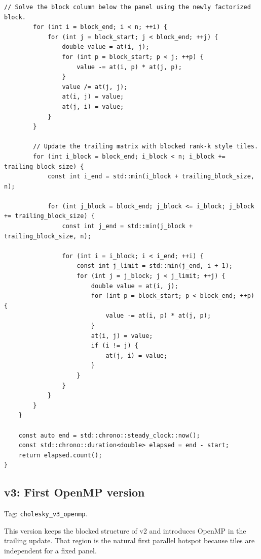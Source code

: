 \begin{lstlisting}[style=appendixcode]
        // Solve the block column below the panel using the newly factorized block.
        for (int i = block_end; i < n; ++i) {
            for (int j = block_start; j < block_end; ++j) {
                double value = at(i, j);
                for (int p = block_start; p < j; ++p) {
                    value -= at(i, p) * at(j, p);
                }
                value /= at(j, j);
                at(i, j) = value;
                at(j, i) = value;
            }
        }

        // Update the trailing matrix with blocked rank-k style tiles.
        for (int i_block = block_end; i_block < n; i_block += trailing_block_size) {
            const int i_end = std::min(i_block + trailing_block_size, n);

            for (int j_block = block_end; j_block <= i_block; j_block += trailing_block_size) {
                const int j_end = std::min(j_block + trailing_block_size, n);

                for (int i = i_block; i < i_end; ++i) {
                    const int j_limit = std::min(j_end, i + 1);
                    for (int j = j_block; j < j_limit; ++j) {
                        double value = at(i, j);
                        for (int p = block_start; p < block_end; ++p) {
                            value -= at(i, p) * at(j, p);
                        }
                        at(i, j) = value;
                        if (i != j) {
                            at(j, i) = value;
                        }
                    }
                }
            }
        }
    }

    const auto end = std::chrono::steady_clock::now();
    const std::chrono::duration<double> elapsed = end - start;
    return elapsed.count();
}
\end{lstlisting}

\subsection{v3: First OpenMP version}

Tag: \texttt{cholesky\_v3\_openmp}.

This version keeps the blocked structure of v2 and introduces OpenMP in the trailing update. That region is the natural first parallel hotspot because tiles are independent for a fixed panel.


